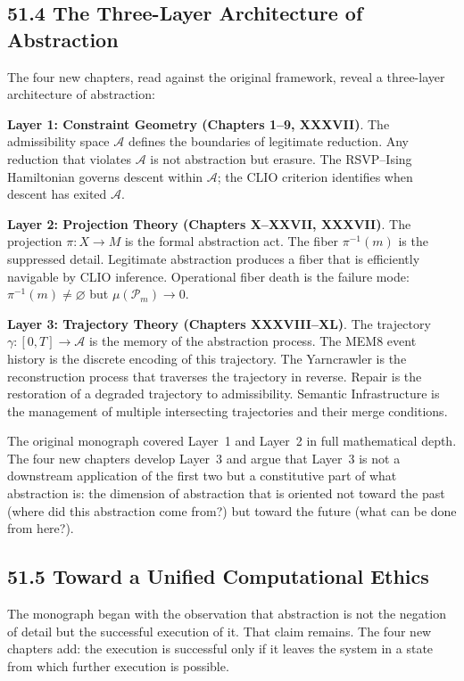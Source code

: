 \documentclass[12pt,letterpaper]{article}
\theoremstyle{remark}
\begin{document}
\subsection{51.4 The Three-Layer Architecture of Abstraction}

The four new chapters, read against the original framework, reveal
a three-layer architecture of abstraction:

\textbf{Layer 1: Constraint Geometry (Chapters 1--9, XXXVII)}. The
admissibility space $\mathcal{A}$ defines the boundaries of
legitimate reduction. Any reduction that violates $\mathcal{A}$
is not abstraction but erasure. The RSVP--Ising Hamiltonian governs
descent within $\mathcal{A}$; the CLIO criterion identifies when
descent has exited $\mathcal{A}$.

\textbf{Layer 2: Projection Theory (Chapters X--XXVII, XXXVII)}. The
projection $\pi: X \to M$ is the formal abstraction act. The fiber
$\pi^{-1}(m)$ is the suppressed detail. Legitimate abstraction
produces a fiber that is efficiently navigable by CLIO inference.
Operational fiber death is the failure mode: $\pi^{-1}(m) \neq
\varnothing$ but $\mu(\mathcal{P}_m) \to 0$.

\textbf{Layer 3: Trajectory Theory (Chapters XXXVIII--XL)}. The
trajectory $\gamma: [0,T] \to \mathcal{A}$ is the memory of
the abstraction process. The MEM\textbar{}8 event history is the
discrete encoding of this trajectory. The Yarncrawler is the
reconstruction process that traverses the trajectory in reverse.
Repair is the restoration of a degraded trajectory to admissibility.
Semantic Infrastructure is the management of multiple intersecting
trajectories and their merge conditions.

The original monograph covered Layer~1 and Layer~2 in full
mathematical depth. The four new chapters develop Layer~3 and argue
that Layer~3 is not a downstream application of the first two but a
constitutive part of what abstraction is: the dimension of
abstraction that is oriented not toward the past (where did this
abstraction come from?) but toward the future (what can be done
from here?).

\subsection{51.5 Toward a Unified Computational Ethics}

The monograph began with the observation that abstraction is not
the negation of detail but the successful execution of it. That
claim remains. The four new chapters add: the execution is
successful only if it leaves the system in a state from which
further execution is possible.
\end{document}

